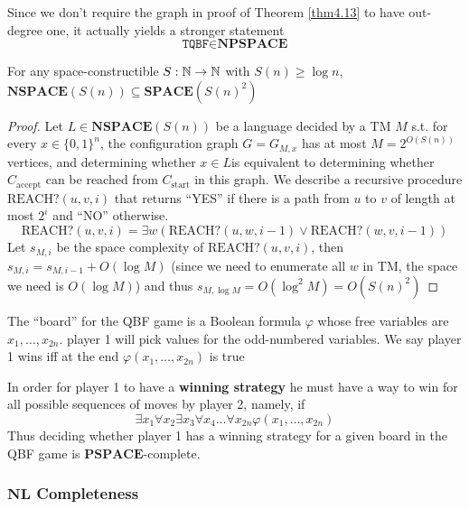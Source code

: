 \documentclass[11pt]{article}
\def \SPACE {\textbf{SPACE}}
\def \PSPACE {\textbf{PSPACE}}
\def \NPSPACE {\textbf{NPSPACE}}
\def \NSPACE {\textbf{NSPACE}}
\def \NL {\textbf{NL}}
\def \start {\text{start}}
\def \accept {\text{accept}}
\def \TQBF {\texttt{TQBF}}
\begin{document}
Since we don't require the graph in proof of Theorem \ref{thm4.13} to have out-degree one, it
actually yields a stronger statement
\begin{equation*}
\TQBF\in\NPSPACE
\end{equation*}

\begin{theorem}
For any space-constructible \(S:\mathbb{N}\to\mathbb{N}\) with \(S(n)\ge\log n\), \(\NSPACE(S(n))\subseteq\SPACE(S(n)^2)\)
\end{theorem}

\begin{proof}
Let \(L\in\NSPACE(S(n))\) be a language decided by a TM \(M\) s.t. for every \(x\in\{0,1\}^n\), the
configuration graph \(G=G_{M,x}\) has at most \(M=2^{O(S(n))}\) vertices, and determining
whether \(x\in L\)is equivalent to determining whether \(C_{\accept}\) can be reached
from \(C_{\start}\) in this graph. We describe a recursive procedure \(\text{REACH?}(u,v,i)\)
that returns ``YES'' if there is a path from \(u\) to \(v\) of length at most \(2^i\) and ``NO''
otherwise.
\begin{equation*}
\text{REACH?}(u,v,i)=\exists w(\text{REACH?}(u,w,i-1)\vee\text{REACH?}(w,v,i-1))
\end{equation*}
Let \(s_{M,i}\) be the space complexity of \(\text{REACH?}(u,v,i)\),
then \(s_{M,i}=s_{M,i-1}+O(\log M)\) (since we need to enumerate all \(w\) in TM, the space we
need is \(O(\log M)\)) and thus
\(s_{M,\log M}=O(\log^2 M)=O(S(n)^2)\)
\end{proof}

\begin{examplle}
The ``board'' for the QBF game is a Boolean formula \(\varphi\) whose free variables are \(x_1,\dots,x_{2n}\).
player 1 will pick values for the odd-numbered variables. We say player 1 wins iff at the end
\(\varphi(x_1,\dots,x_{2n})\) is true

In order for player 1 to have a \textbf{winning strategy} he must have a way to win for all possible
sequences of moves by player 2, namely, if
\begin{equation*}
\exists x_1\forall x_2 \exists x_3\forall x_4\dots\forall x_{2n}\varphi(x_1,\dots,x_{2n})
\end{equation*}
Thus deciding whether player 1 has a winning strategy for a given board in the QBF game is \(\PSPACE\)-complete.
\end{examplle}
\subsubsection{\(\NL\) Completeness}
\label{sec:org94d04fc}
\end{document}
